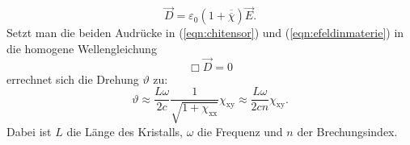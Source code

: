 \begin{equation}
  \label{eqn:efeldinmaterie}
  \vec{D}=\varepsilon_0\left(1+\overline{\overline{\chi}}\right)\vec{E}.
\end{equation}
Setzt man die beiden Audrücke in (\ref{eqn:chitensor}) und (\ref{eqn:efeldinmaterie}) in die homogene Wellengleichung
\begin{equation*}
  \Box \vec{D} = 0
\end{equation*}
errechnet sich die Drehung $\vartheta$ \cite[3-5]{Anleitung} zu:
\begin{equation}
  \label{eq:drehungmitchi}
  \vartheta \approx \frac{L\omega}{2c} \frac{1}{\sqrt{1+\chi_\mathrm{xx}}} \chi_\mathrm{xy}\approx \frac{L\omega}{2cn} \chi_\mathrm{xy}.
\end{equation}
Dabei ist $L$ die Länge des Kristalls, $\omega$ die Frequenz und $n$ der Brechungsindex.
